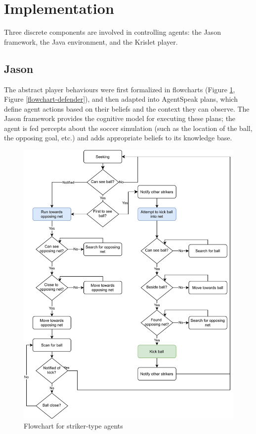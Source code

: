 \documentclass[conference]{IEEEtran}
\begin{document}
\section{Implementation}
Three discrete components are involved in controlling agents: the Jason framework, the Java environment, and the Krislet player. 

\subsection{Jason}
The abstract player behaviours were first formalized in flowcharts (Figure \ref{flowchart-striker}, Figure  \ref{flowchart-defender}), and then adapted into AgentSpeak plans, which define agent actions based on their beliefs and the context they can observe. The Jason framework provides the cognitive model for executing these plans; the agent is fed percepts about the soccer simulation (such as the location of the ball, the opposing goal, etc.) and adds appropriate beliefs to its knowledge base.

\begin{figure}[]
	\centering
	\includegraphics[scale=0.5]{fig/striker-flowchart.pdf}
	\caption{Flowchart for striker-type agents}
	\label{flowchart-striker}
\end{figure}
\end{document}
